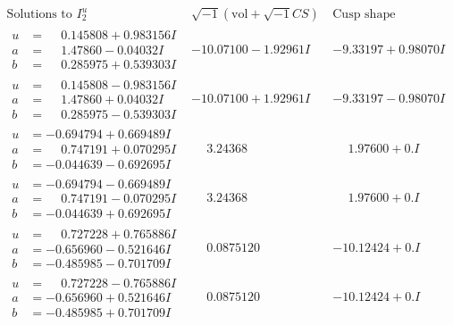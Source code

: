 \documentclass[1p]{elsarticle_modified}
\theoremstyle{definition}
\newcommand{\I}{\sqrt{-1}}
\begin{document}
$$\begin{array}{c|c|c}  
\text{Solutions to }I^u_{2}& \I (\text{vol} + \sqrt{-1}CS) & \text{Cusp shape}\\
 \hline 
\begin{aligned}
u &= \phantom{-}0.145808 + 0.983156 I \\
a &= \phantom{-}1.47860 - 0.04032 I \\
b &= \phantom{-}0.285975 + 0.539303 I\end{aligned}
 & -10.07100 - 1.92961 I & -9.33197 + 0.98070 I \\ \hline\begin{aligned}
u &= \phantom{-}0.145808 - 0.983156 I \\
a &= \phantom{-}1.47860 + 0.04032 I \\
b &= \phantom{-}0.285975 - 0.539303 I\end{aligned}
 & -10.07100 + 1.92961 I & -9.33197 - 0.98070 I \\ \hline\begin{aligned}
u &= -0.694794 + 0.669489 I \\
a &= \phantom{-}0.747191 + 0.070295 I \\
b &= -0.044639 - 0.692695 I\end{aligned}
 & \phantom{-}3.24368\phantom{ +0.000000I} & \phantom{-}1.97600 + 0. I\phantom{ +0.000000I} \\ \hline\begin{aligned}
u &= -0.694794 - 0.669489 I \\
a &= \phantom{-}0.747191 - 0.070295 I \\
b &= -0.044639 + 0.692695 I\end{aligned}
 & \phantom{-}3.24368\phantom{ +0.000000I} & \phantom{-}1.97600 + 0. I\phantom{ +0.000000I} \\ \hline\begin{aligned}
u &= \phantom{-}0.727228 + 0.765886 I \\
a &= -0.656960 - 0.521646 I \\
b &= -0.485985 - 0.701709 I\end{aligned}
 & \phantom{-}0.0875120\phantom{ +0.000000I} & -10.12424 + 0. I\phantom{ +0.000000I} \\ \hline\begin{aligned}
u &= \phantom{-}0.727228 - 0.765886 I \\
a &= -0.656960 + 0.521646 I \\
b &= -0.485985 + 0.701709 I\end{aligned}
 & \phantom{-}0.0875120\phantom{ +0.000000I} & -10.12424 + 0. I\phantom{ +0.000000I} \\ \hline\begin{aligned}

\end{aligned}
\end{array}$$
\end{document}
